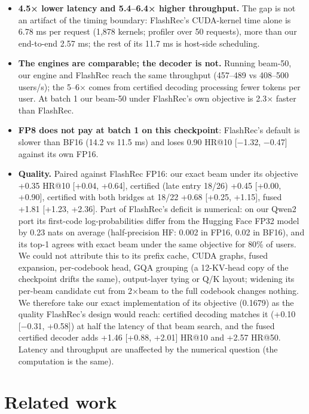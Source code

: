\documentclass[11pt]{article}
\begin{document}
\begin{itemize}
\item \textbf{4.5× lower latency and 5.4–6.4× higher throughput.} The gap is not an artifact of the timing boundary: FlashRec's CUDA-kernel time alone is 6.78 ms per request (1,878 kernels; profiler over 50 requests), more than our end-to-end 2.57 ms; the rest of its 11.7 ms is host-side scheduling.
\item \textbf{The engines are comparable; the decoder is not.} Running beam-50, our engine and FlashRec reach the same throughput (457–489 vs 408–500 users/s); the 5–6× comes from certified decoding processing fewer tokens per user. At batch 1 our beam-50 under FlashRec's own objective is 2.3× faster than FlashRec.
\item \textbf{FP8 does not pay at batch 1 on this checkpoint}: FlashRec's default is slower than BF16 (14.2 vs 11.5 ms) and loses 0.90 HR@10 [−1.32, −0.47] against its own FP16.
\item \textbf{Quality.} Paired against FlashRec FP16: our exact beam under its objective +0.35 HR@10 [+0.04, +0.64], certified (late entry 18/26) +0.45 [+0.00, +0.90], certified with both bridges at 18/22 +0.68 [+0.25, +1.15], fused +1.81 [+1.23, +2.36]. Part of FlashRec's deficit is numerical: on our Qwen2 port its first-code log-probabilities differ from the Hugging Face FP32 model by 0.23 nats on average (half-precision HF: 0.002 in FP16, 0.02 in BF16), and its top-1 agrees with exact beam under the same objective for 80\% of users. We could not attribute this to its prefix cache, CUDA graphs, fused expansion, per-codebook head, GQA grouping (a 12-KV-head copy of the checkpoint drifts the same), output-layer tying or Q/K layout; widening its per-beam candidate cut from 2×beam to the full codebook changes nothing. We therefore take our exact implementation of its objective (0.1679) as the quality FlashRec's design would reach: certified decoding matches it (+0.10 [−0.31, +0.58]) at half the latency of that beam search, and the fused certified decoder adds +1.46 [+0.88, +2.01] HR@10 and +2.57 HR@50. Latency and throughput are unaffected by the numerical question (the computation is the same).
\end{itemize}

\section{Related work}\label{sec:9}
\end{document}
